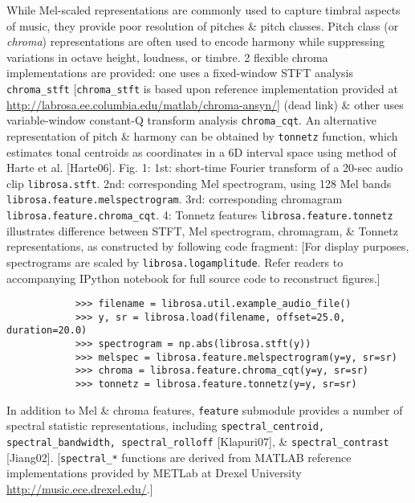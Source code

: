 \documentclass{article}
\begin{document}
\begin{itemize}
\begin{itemize}
		While Mel-scaled representations are commonly used to capture timbral aspects of music, they provide poor resolution of pitches \& pitch classes. Pitch class (or {\it chroma}) representations are often used to encode harmony while suppressing variations in octave height, loudness, or timbre. 2 flexible chroma implementations are provided: one uses a fixed-window STFT analysis \verb|chroma_stft| [\verb|chroma_stft| is based upon reference implementation provided at \url{http://labrosa.ee.columbia.edu/matlab/chroma-ansyn/}] (dead link) \& other uses variable-window constant-Q transform analysis \verb|chroma_cqt|. An alternative representation of pitch \& harmony can be obtained by {\tt tonnetz} function, which estimates tonal centroids as coordinates in a 6D interval space using method of Harte et al. [Harte06]. {\sf Fig. 1: 1st: short-time Fourier transform of a 20-sec audio clip {\tt librosa.stft}. 2nd: corresponding Mel spectrogram, using 128 Mel bands {\tt librosa.feature.melspectrogram}. 3rd: corresponding chromagram \verb|librosa.feature.chroma_cqt|. 4: Tonnetz features {\tt librosa.feature.tonnetz}} illustrates difference between STFT, Mel spectrogram, chromagram, \& Tonnetz representations, as constructed by following code fragment: [For display purposes, spectrograms are scaled by {\tt librosa.logamplitude}. Refer readers to accompanying IPython notebook for full source code to reconstruct figures.]
		\begin{verbatim}
			>>> filename = librosa.util.example_audio_file()
			>>> y, sr = librosa.load(filename, offset=25.0, duration=20.0)
			>>> spectrogram = np.abs(librosa.stft(y))
			>>> melspec = librosa.feature.melspectrogram(y=y, sr=sr)
			>>> chroma = librosa.feature.chroma_cqt(y=y, sr=sr)
			>>> tonnetz = librosa.feature.tonnetz(y=y, sr=sr)
		\end{verbatim}
		In addition to Mel \& chroma features, {\tt feature} submodule provides a number of spectral statistic representations, including \verb|spectral_centroid, spectral_bandwidth, spectral_rolloff| [Klapuri07], \& \verb|spectral_contrast| [Jiang02]. [\verb|spectral_*| functions are derived from MATLAB reference implementations provided by METLab at Drexel University \url{http://music.ece.drexel.edu/}.]
		

\end{itemize}
\end{itemize}
\end{document}
